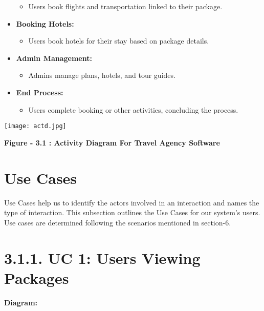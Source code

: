 \documentclass{scrreprt}
\begin{document}
\begin{itemize}
    \begin{itemize}
        \item Users book flights and transportation linked to their package.
    \end{itemize}
    \item \textbf{Booking Hotels:}
    \begin{itemize}
        \item Users book hotels for their stay based on package details.
    \end{itemize}
    \item \textbf{Admin Management:}
    \begin{itemize}
        \item Admins manage plans, hotels, and tour guides.
    \end{itemize}
    \item \textbf{End Process:}
    \begin{itemize}
        \item Users complete booking or other activities, concluding the process.
    \end{itemize}
\end{itemize}
{\texttt{[image: actd.jpg]}}

\begin{center}
    \parbox{0.8\textwidth}{ 
        \centering
        \textbf{Figure - 3.1 : Activity Diagram For Travel Agency Software}
    }
\end{center}
\section{Use Cases}
Use Cases help us to identify the actors involved in an interaction and names the type of interaction.
This subsection outlines the Use Cases for our system’s users. Use cases are determined following
the scenarios mentioned in section-6.

\section*{\textbf{3.1.1. UC 1: Users Viewing Packages}}
\textbf{Diagram:}
\newline
\newline
\begin{center}
    \parbox{0.8\textwidth}{ 
        \centering
    }
\end{center}
\end{document}
